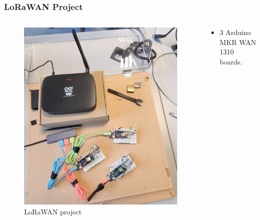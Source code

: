 \documentclass{beamer}
\begin{document}
\begin{frame}
    \frametitle{LoRaWAN Project}
    \begin{columns}
        \begin{column}{0.5\textwidth}
            \begin{figure}
                \centering
                \includegraphics[width=\textwidth]{images/lorawan_project.jpg}
                \caption{LoRaWAN project}
            \end{figure}
        \end{column}
        \begin{column}{0.5\textwidth}
            \begin{itemize}[<+->]
                \item 3 Arduino MKR WAN 1310 boards.
                      \begin{itemize}[<+->]

\end{itemize}
\end{itemize}
\end{column}
\end{columns}
\end{frame}
\end{document}
